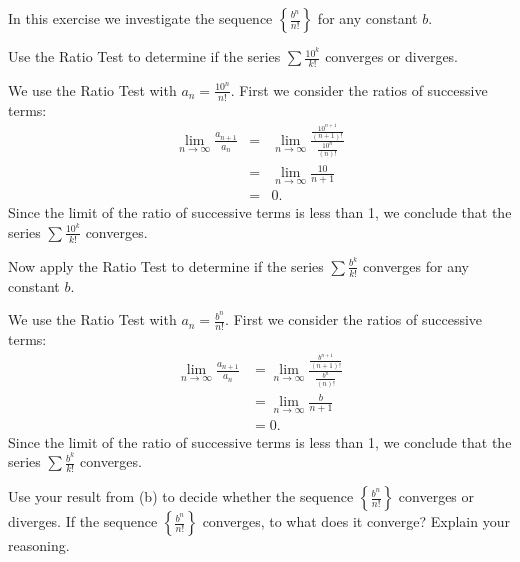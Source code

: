 \begin{exercises}

\item In this exercise we investigate the sequence $\left\{\frac{b^n}{n!}\right\}$ for any constant $b$.
    \ba
    \item Use the Ratio Test to determine if the series $\sum \frac{10^k}{k!}$ converges or diverges.

\begin{exerciseSolution}

\solution We use the Ratio Test with $a_n = \frac{10^n}{n!}$. First we consider the ratios of successive terms:
\begin{eqnarray*}
\lim_{n \to \infty} \frac{a_{n+1}}{a_n} &=& \lim_{n \to \infty} \frac{ \frac{10^{n+1}}{(n+1)!}}{ \frac{10^{n}}{(n)!} } \\
    &=& \lim_{n \to \infty} \frac{10}{n+1} \\
    &=& 0.
\end{eqnarray*}
Since the limit of the ratio of successive terms is less than 1, we conclude that the series $\sum \frac{10^k}{k!}$ converges.

\end{exerciseSolution}

\item Now apply the Ratio Test to determine if the series $\sum \frac{b^k}{k!}$ converges for any constant $b$.

\begin{exerciseSolution}

\solution We use the Ratio Test with $a_n = \frac{b^n}{n!}$. First we consider the ratios of successive terms:
\begin{align*}
\lim_{n \to \infty} \frac{a_{n+1}}{a_n} &= \lim_{n \to \infty} \frac{ \frac{b^{n+1}}{(n+1)!} }{ \frac{b^{n}}{(n)!} } \\
    &= \lim_{n \to \infty} \frac{b}{n+1} \\
    &= 0.
\end{align*}
Since the limit of the ratio of successive terms is less than 1, we conclude that the series $\sum \frac{b^k}{k!}$ converges.

\end{exerciseSolution}

\item Use your result from (b) to decide whether the sequence  $\left\{\frac{b^n}{n!}\right\}$ converges or diverges. If the sequence $\left\{\frac{b^n}{n!}\right\}$ converges, to what does it converge? Explain your reasoning.


\end{exercises}
